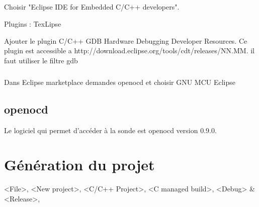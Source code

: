 \documentclass[a4paper,11pt]{report}
\begin{document}
\paragraph{}
Choisir "Eclipse IDE for Embedded C/C++ developers".

Plugins : TexLipse

Ajouter le plugin     C/C++ GDB Hardware Debugging Developer Resources.
Ce plugin est accessible a http://download.eclipse.org/tools/cdt/releases/NN.MM.
il faut utiliser le filtre gdb

\paragraph{}
Dans Eclipse marketplace demandes openocd et choisir GNU MCU Eclipse

\section{openocd}
Le logiciel qui permet d'accéder à la sonde est openocd version 0.9.0.

\chapter{Génération du projet}

<File>, <New project>, <C/C++ Project>, <C managed build>, <Debug> \& <Release>,
\end{document}
